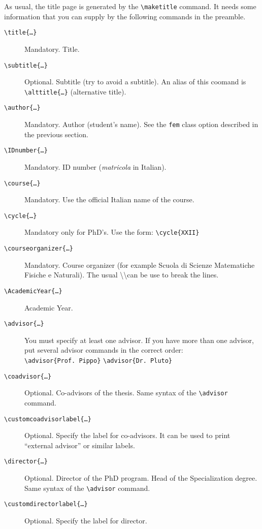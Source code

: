 \documentclass[a5paper,11pt]{article}
\newcommand{\bs}{\textbackslash}
\begin{document}
As usual, the title page is generated by the \texttt{\bs maketitle} command.
It needs some information that you can supply by the following commands
in the preamble.
\begin{description}
\item[\texttt{\bs title\{\dots\}}] Mandatory. Title.

\item[\texttt{\bs subtitle\{\dots\}}] Optional. Subtitle (try to avoid a subtitle). An alias of this coomand is \texttt{\bs alttitle\{\dots\}} (alternative title).

\item[\texttt{\bs author\{\dots\}}] Mandatory. Author (student's name). See the \texttt{fem} class option described in the previous section.

\item[\texttt{\bs IDnumber\{\dots\}}] Mandatory. ID number (\textit{matricola} in Italian).

\item[\texttt{\bs course\{\dots\}}] Mandatory. Use the official Italian name of the course.

\item[\texttt{\bs cycle\{\dots\}}] Mandatory only for PhD's. Use the form: \texttt{\bs cycle\{XXII\}}

\item[\texttt{\bs courseorganizer\{\dots\}}] Mandatory. Course organizer (for example Scuola di Scienze Matematiche Fisiche e Naturali). The usual \bs\bs can be use to break the lines.

\item[\texttt{\bs AcademicYear\{\dots\}}] Academic Year.

\item[\texttt{\bs advisor\{\dots\}}] You must specify at least one advisor.
If you have more than one advisor, put several advisor commands in the correct order:\\
\texttt{\bs advisor\{Prof.~Pippo\}} \texttt{\bs advisor\{Dr.~Pluto\}}

\item[\texttt{\bs coadvisor\{\dots\}}] Optional. Co-advisors of the thesis. 
Same syntax of the \texttt{\bs advisor} command.

\item[\texttt{\bs customcoadvisorlabel\{\dots\}}] Optional. Specify the label for co-advisors. It can be used to print ``external advisor'' or similar labels.

\item[\texttt{\bs director\{\dots\}}] Optional. Director of the PhD program. Head of the Specialization degree. Same syntax of the \texttt{\bs advisor} command.

\item[\texttt{\bs customdirectorlabel\{\dots\}}] Optional. Specify the label for director.

\end{description}
\end{document}
